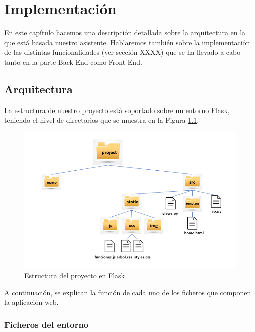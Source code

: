 \chapter{Implementación}
\label{cap:implementacion}



En este capítulo hacemos una descripción detallada sobre la arquitectura en la que está basada nuestro asistente. Hablaremos también sobre la implementación de las distintas funcionalidades (ver sección XXXX) que se ha llevado a cabo tanto en la parte Back End como Front End.


\section{Arquitectura}

La estructura de nuestro proyecto está soportado sobre un entorno Flask, teniendo el nivel de directorios que se muestra en la Figura \ref{fig:projectStructure}.

	 \begin{figure}[h!]
	\centering
	
	
	\includegraphics[scale=1.2]{Imagenes/Figuras/Project-Structure}
	
	
	\caption{Estructura del proyecto en Flask}
	\label{fig:projectStructure}
\end{figure}

A continuación, se explican la función de cada uno de los ficheros que componen la aplicación web.

\subsection{Ficheros del entorno}

